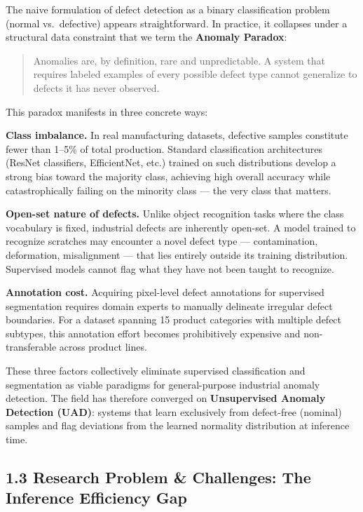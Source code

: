 The naive formulation of defect detection as a binary classification problem (normal vs.~defective) appears straightforward. In practice, it collapses under a structural data constraint that we term the \textbf{Anomaly Paradox}:

\begin{quote}
Anomalies are, by definition, rare and unpredictable. A system that requires labeled examples of every possible defect type cannot generalize to defects it has never observed.
\end{quote}

This paradox manifests in three concrete ways:

\textbf{Class imbalance.} In real manufacturing datasets, defective samples constitute fewer than 1--5\% of total production. Standard classification architectures (ResNet classifiers, EfficientNet, etc.) trained on such distributions develop a strong bias toward the majority class, achieving high overall accuracy while catastrophically failing on the minority class --- the very class that matters.

\textbf{Open-set nature of defects.} Unlike object recognition tasks where the class vocabulary is fixed, industrial defects are inherently open-set. A model trained to recognize scratches may encounter a novel defect type --- contamination, deformation, misalignment --- that lies entirely outside its training distribution. Supervised models cannot flag what they have not been taught to recognize.

\textbf{Annotation cost.} Acquiring pixel-level defect annotations for supervised segmentation requires domain experts to manually delineate irregular defect boundaries. For a dataset spanning 15 product categories with multiple defect subtypes, this annotation effort becomes prohibitively expensive and non-transferable across product lines.

These three factors collectively eliminate supervised classification and segmentation as viable paradigms for general-purpose industrial anomaly detection. The field has therefore converged on \textbf{Unsupervised Anomaly Detection (UAD)}: systems that learn exclusively from defect-free (nominal) samples and flag deviations from the learned normality distribution at inference time.

\subsection{1.3 Research Problem \& Challenges: The Inference Efficiency Gap}\label{research-problem-challenges-the-inference-efficiency-gap}

